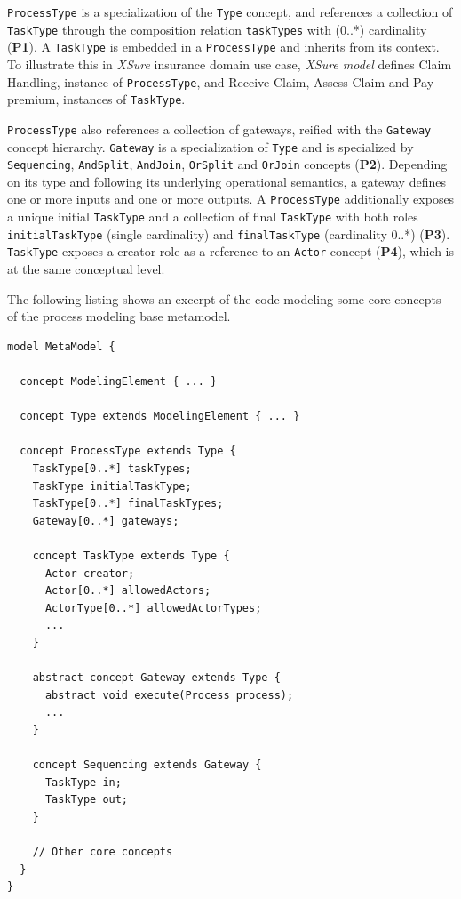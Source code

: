 \texttt{ProcessType} is a specialization of the \texttt{Type} concept, and references a collection of \texttt{TaskType} through the composition relation \texttt{taskTypes} with (0..*) cardinality (\textbf{P1}). A \texttt{TaskType} is embedded in a \texttt{ProcessType} and inherits from its context. To illustrate this in \textit{XSure} insurance domain use case, \textit{XSure model} defines \textsf{Claim Handling}, instance of \texttt{ProcessType}, and \textsf{Receive Claim}, \textsf{Assess Claim} and \textsf{Pay premium}, instances of \texttt{TaskType}.

\texttt{ProcessType} also references a collection of gateways, reified with the \texttt{Gateway} concept hierarchy. \texttt{Gateway} is a specialization of \texttt{Type} and is specialized by \texttt{Sequencing}, \texttt{AndSplit}, \texttt{AndJoin}, \texttt{OrSplit} and \texttt{OrJoin} concepts (\textbf{P2}). Depending on its type and following its underlying operational semantics, a gateway defines one or more inputs and one or more outputs. A \texttt{ProcessType} additionally exposes a unique initial \texttt{TaskType} and a collection of final \texttt{TaskType} with both roles \texttt{initialTaskType} (single cardinality) and \texttt{finalTaskType} (cardinality 0..*) (\textbf{P3}). \texttt{TaskType} exposes a creator role as a reference to an \texttt{Actor} concept (\textbf{P4}), which is at the same conceptual level. 

The following listing shows an excerpt of the \FML code modeling some core concepts of the process modeling base metamodel. 

\begin{lstlisting}
model MetaModel {

  concept ModelingElement { ... }
  
  concept Type extends ModelingElement { ... }
  
  concept ProcessType extends Type {
    TaskType[0..*] taskTypes;
    TaskType initialTaskType;
    TaskType[0..*] finalTaskTypes;
    Gateway[0..*] gateways;
        
    concept TaskType extends Type {
      Actor creator;
      Actor[0..*] allowedActors;
      ActorType[0..*] allowedActorTypes;
      ...
    }
        
    abstract concept Gateway extends Type {
      abstract void execute(Process process);
      ...
    }
        
    concept Sequencing extends Gateway {
      TaskType in;
      TaskType out;
    }
    
    // Other core concepts
  }
}    
\end{lstlisting}


